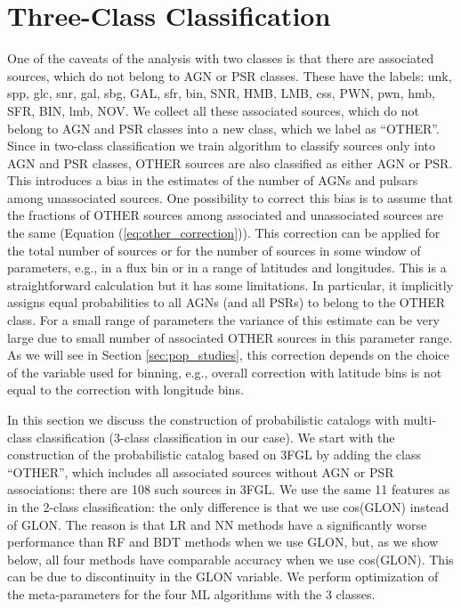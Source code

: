 \section{Three-Class Classification}

One of the caveats of the analysis with two classes is that there are associated sources, which do not belong to AGN or PSR classes. These have the labels: unk, spp, glc, snr, gal, sbg, GAL, sfr, bin, SNR, HMB, LMB, css, PWN, pwn, hmb, SFR, BIN, lmb, NOV.
We collect all these associated sources, which do not belong to AGN and PSR classes into a new class, which we label as ``OTHER''.
Since in two-class classification we train algorithm to classify sources only into AGN and PSR classes, OTHER sources are also classified as either AGN or PSR.
This introduces a bias in the estimates of the number of AGNs and pulsars among unassociated sources.
One possibility to correct this bias is to assume that the fractions of OTHER sources among associated and unassociated sources are the same (Equation (\ref{eq:other_correction})).
This correction can be applied for the total number of sources or for the number of sources in some window of parameters,
e.g., in a flux bin or in a range of latitudes and longitudes.
This is a straightforward calculation but it has some limitations. In particular, it implicitly assigns equal probabilities to all AGNs (and all PSRs) to belong to the OTHER class.
For a small range of parameters the variance of this estimate can be very large due to small number of associated OTHER sources in this parameter range.
As we will see in Section \ref{sec:pop_studies}, this correction depends on the choice of the variable used for binning, e.g.,
overall correction with latitude bins is not equal to the correction with longitude bins.

In this section we discuss the construction of probabilistic catalogs with multi-class classification (3-class classification in our case).
We start with the construction of the probabilistic catalog based on 3FGL by adding the class ``OTHER'', which includes all associated sources without AGN or PSR associations: there are 108 such sources in 3FGL.
We use the same 11 features as in the 2-class classification: the only difference is that we use cos(GLON) instead of GLON.
The reason is that LR and NN methods have a significantly worse performance than RF and BDT methods when we use GLON,
but, as we show below, all four methods have comparable accuracy when we use cos(GLON).
This can be due to discontinuity in the GLON variable. 
We perform optimization of the meta-parameters for the four ML algorithms with the 3 classes.


